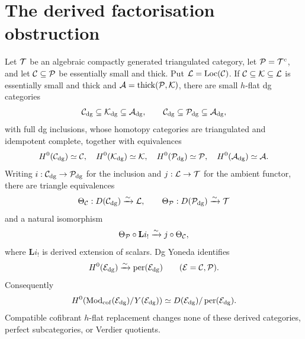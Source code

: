 
\section{The derived factorisation obstruction}\label{sec:obstruction}

\begin{proposition}\label{prop:compatible-dg-models}
Let \(\mathcal T\) be an algebraic compactly generated triangulated category, let \(\mathcal P=\mathcal T^c\), and let \(\mathcal C\subseteq\mathcal P\) be essentially small and thick.  Put \(\mathcal L=\operatorname{Loc}(\mathcal C)\).  If \(\mathcal C\subseteq\mathcal K\subseteq\mathcal L\) is essentially small and thick and \(\mathcal A=\operatorname{thick}(\mathcal P,\mathcal K)\), there are small \(h\)-flat dg categories
\[
 \mathcal C_{\mathrm{dg}}\subseteq\mathcal K_{\mathrm{dg}}\subseteq\mathcal A_{\mathrm{dg}},
 \qquad
 \mathcal C_{\mathrm{dg}}\subseteq\mathcal P_{\mathrm{dg}}\subseteq\mathcal A_{\mathrm{dg}},
\]
with full dg inclusions, whose homotopy categories are triangulated and idempotent complete, together with equivalences
\[
 H^0(\mathcal C_{\mathrm{dg}})\simeq\mathcal C,\quad
 H^0(\mathcal K_{\mathrm{dg}})\simeq\mathcal K,\quad
 H^0(\mathcal P_{\mathrm{dg}})\simeq\mathcal P,\quad
 H^0(\mathcal A_{\mathrm{dg}})\simeq\mathcal A.
\]
Writing \(i:\mathcal C_{\mathrm{dg}}\to\mathcal P_{\mathrm{dg}}\) for the inclusion and \(j:\mathcal L\to\mathcal T\) for the ambient functor, there are triangle equivalences
\[
 \Theta_{\mathcal C}:D(\mathcal C_{\mathrm{dg}})\xrightarrow{\sim}\mathcal L,
 \qquad
 \Theta_{\mathcal P}:D(\mathcal P_{\mathrm{dg}})\xrightarrow{\sim}\mathcal T
\]
and a natural isomorphism
\[
 \Theta_{\mathcal P}\circ\mathbf L i_!\xrightarrow{\sim}j\circ\Theta_{\mathcal C},
\]
where \(\mathbf L i_!\) is derived extension of scalars.  Dg Yoneda identifies
\[
 H^0(\mathcal E_{\mathrm{dg}})\xrightarrow{\sim}\operatorname{per}(\mathcal E_{\mathrm{dg}})
 \qquad(\mathcal E=\mathcal C,\mathcal P).
\]
Consequently
\[
 H^0\!\left(\operatorname{Mod}_{\mathrm{cof}}(\mathcal E_{\mathrm{dg}})/Y(\mathcal E_{\mathrm{dg}})\right)
 \simeq D(\mathcal E_{\mathrm{dg}})/\operatorname{per}(\mathcal E_{\mathrm{dg}}).
\]
Compatible cofibrant \(h\)-flat replacement changes none of these derived categories, perfect subcategories, or Verdier quotients.
\end{proposition}

